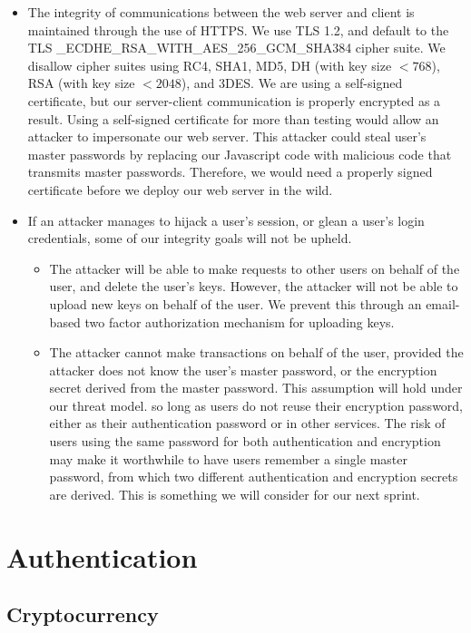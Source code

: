 \documentclass[a4paper,12pt]{article}
\begin{document}
\begin{itemize}
	\item The integrity of communications between the web server and client is maintained through the use of HTTPS.
	We use TLS 1.2, and default to the TLS \_ECDHE\_RSA\_WITH\_AES\_256\_GCM\_SHA384 cipher suite.
	We disallow cipher suites using RC4, SHA1, MD5, DH (with key size $< 768$), RSA (with key size $< 2048$), and 3DES.
	We are using a self-signed certificate, but our server-client communication is properly encrypted as a result.
	Using a self-signed certificate for more than testing would allow an attacker to impersonate our web server. This attacker could steal user's master passwords by replacing our Javascript code with malicious code that transmits master passwords.
	Therefore, we would need a properly signed certificate before we deploy our web server in the wild.

	\item If an attacker manages to hijack a user's session, or glean a user's login credentials, some of our integrity goals will not be upheld.
	\begin{itemize}
		\item The attacker will be able to make requests to other users on behalf of the user, and delete the user's keys.
		However, the attacker will not be able to upload new keys on behalf of the user.
		We prevent this through an email-based two factor authorization mechanism for uploading keys.
		\item The attacker cannot make transactions on behalf of the user, provided the attacker does not know the user's master password, or the encryption secret derived from the master password.
		This assumption will hold under our threat model. so long as users do not reuse their encryption password, either as their authentication password or in other services.
		The risk of users using the same password for both authentication and encryption may make it worthwhile to have users remember a single master password, from which two different authentication and encryption secrets are derived. %
		This is something we will consider for our next sprint.
	\end{itemize}
\end{itemize}

\section{Authentication}

\subsection{Cryptocurrency}
\end{document}
